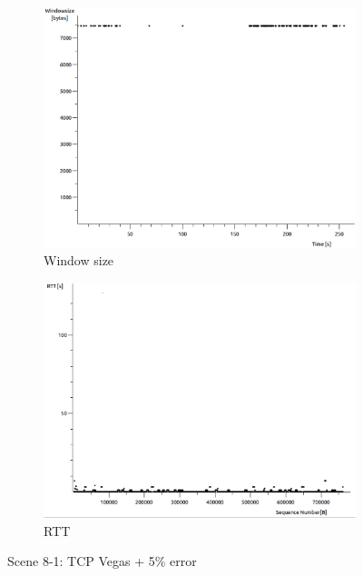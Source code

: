 \documentclass[conference,a4paper]{IEEEtran}
\begin{document}
\begin{figure}
\begin{subfigure}[b]{0.2\textwidth}
  \includegraphics[width=\textwidth]{s8-1_wsize}
  \caption{Window size}
 \end{subfigure}
 \begin{subfigure}[b]{0.2\textwidth}
  \includegraphics[width=\textwidth]{s8-1_rtt}
  \caption{RTT}
 \end{subfigure}
 \caption{Scene 8-1: TCP Vegas + 5\% error}
\end{figure}
\end{document}
